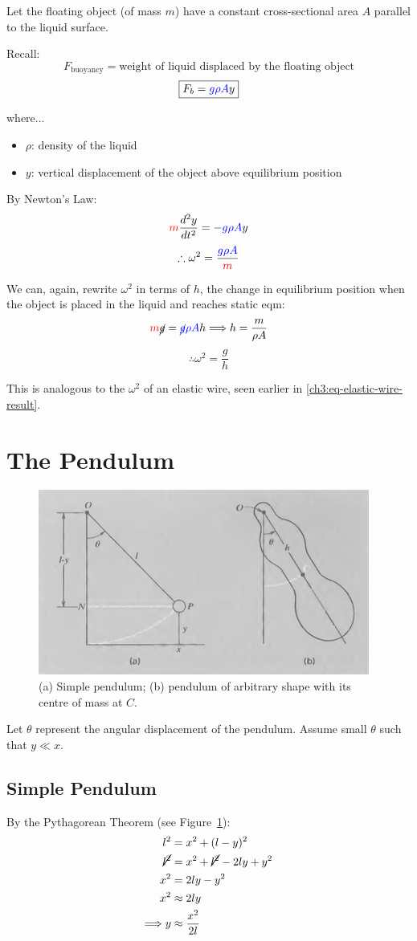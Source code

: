\documentclass[11pt,letterpaper,titlepage,oneside]{book}
\newcommand{\kcol}[1]{\textcolor{blue}{#1}}
\newcommand{\mcol}[1]{\textcolor{red}{#1}}
\begin{document}
Let the floating object (of mass $m$) have a constant cross-sectional area $A$ parallel to the liquid surface.

Recall:
\[ F_\text{buoyancy} = \text{weight of liquid displaced by the floating object} \]
\[ \boxed{F_b  = \kcol{g\rho A}y} \]

where...
\begin{itemize}
	\item $\rho$: density of the liquid
	\item $y$: vertical displacement of the object above equilibrium position
\end{itemize}


By Newton's Law:
\[ \mcol{m}\frac{d^2y}{dt^2} = -\kcol{g\rho A}y \]
\[ \therefore \omega^2 = \frac{\kcol{g\rho A}}{\mcol{m}} \]

We can, again, rewrite $\omega^2$ in terms of $h$, the change in equilibrium position when the object is placed in the liquid and reaches static eqm:
\[ \mcol{m}\cancel{g}=\kcol{\cancel{g}\rho A} h
\Longrightarrow
h = \frac{m}{\rho A} \]
\[ \therefore \omega^2 = \frac{g}{h} \]


This is analogous to the $\omega^2$ of an elastic wire, seen earlier in \eqref{ch3:eq-elastic-wire-result}. 


\section{The Pendulum}
\begin{figure}[h]
	\centering
	\includegraphics[scale=0.6]{phys232/Ch3-pendulum.png} \caption{(a) Simple pendulum; (b) pendulum of arbitrary shape with its centre of mass at $C$.}\label{ch3:fig-pendulum}
\end{figure}

Let $\theta$ represent the angular displacement of the pendulum. Assume small $\theta$ such that $y \ll x$. 


\subsection{Simple Pendulum} \label{ch3:sec-simple-pendulum}
By the Pythagorean Theorem (see Figure~\ref{ch3:fig-pendulum}):
\begin{align}
l^2 &= x^2 + (l-y)^2  \notag \\	
\cancel{l^2} &= x^2 + \cancel{l^2} - 2ly + y^2 \notag \\
x^2 &= 2ly - {y^2} \notag \\
x^2 &\approx 2ly  \notag \\
\Longrightarrow y &\approx \frac{x^2}{2l} \label{ch3:eq-pendulum-pythag}
\end{align}
\end{document}
